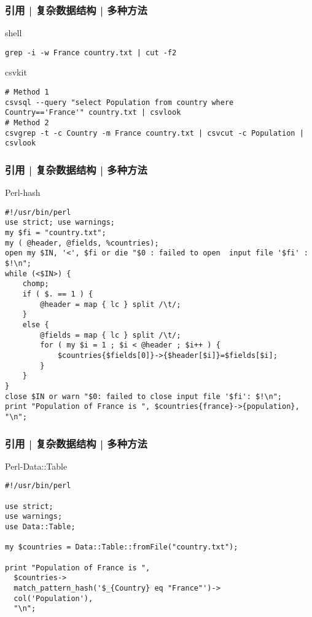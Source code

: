 \begin{frame}[fragile]
  \frametitle{引用 | 复杂数据结构 | 多种方法}
  \begin{block}{shell}
  \vspace{-0.5em}
\begin{lstlisting}
grep -i -w France country.txt | cut -f2
\end{lstlisting}
  \end{block}
  \pause
  \begin{block}{csvkit}
  \vspace{-0.5em}
\begin{lstlisting}
# Method 1
csvsql --query "select Population from country where Country=='France'" country.txt | csvlook
# Method 2
csvgrep -t -c Country -m France country.txt | csvcut -c Population | csvlook
\end{lstlisting}
  \end{block}
\end{frame}

\begin{frame}[fragile]
  \frametitle{引用 | 复杂数据结构 | 多种方法}
  \begin{block}{Perl-hash}
  \vspace{-1em}
\begin{lstlisting}[basicstyle=\scriptsize\tt,numberstyle=\scriptsize]
#!/usr/bin/perl
use strict; use warnings;
my $fi = "country.txt";
my ( @header, @fields, %countries);
open my $IN, '<', $fi or die "$0 : failed to open  input file '$fi' : $!\n";
while (<$IN>) {
    chomp;
    if ( $. == 1 ) {
        @header = map { lc } split /\t/;
    }
    else {
        @fields = map { lc } split /\t/;
        for ( my $i = 1 ; $i < @header ; $i++ ) {
            $countries{$fields[0]}->{$header[$i]}=$fields[$i];
        }
    }
}
close $IN or warn "$0: failed to close input file '$fi': $!\n";
print "Population of France is ", $countries{france}->{population}, "\n";
\end{lstlisting}
  \end{block}
\end{frame}

\begin{frame}[fragile]
  \frametitle{引用 | 复杂数据结构 | 多种方法}
  \begin{block}{Perl-Data::Table}
  \vspace{-0.5em}
\begin{lstlisting}[basicstyle=\small\tt]
#!/usr/bin/perl

use strict;
use warnings;
use Data::Table;

my $countries = Data::Table::fromFile("country.txt");

print "Population of France is ",
  $countries->
  match_pattern_hash('$_{Country} eq "France"')->
  col('Population'),
  "\n";
\end{lstlisting}
  \end{block}
\end{frame}


